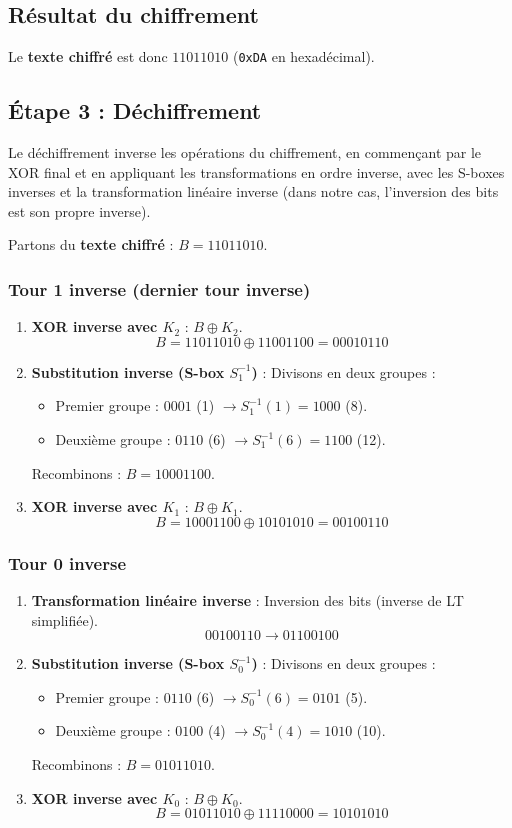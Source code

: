 \documentclass[12pt,a4paper]{report}
\begin{document}
\subsection{Résultat du chiffrement}
Le \textbf{texte chiffré} est donc \( 11011010 \) (\texttt{0xDA} en hexadécimal).

\subsection{Étape 3 : Déchiffrement}
Le déchiffrement inverse les opérations du chiffrement, en commençant par le XOR final et en appliquant les transformations en ordre inverse, avec les S-boxes inverses et la transformation linéaire inverse (dans notre cas, l'inversion des bits est son propre inverse).

Partons du \textbf{texte chiffré} : \( B = 11011010 \).

\subsubsection{Tour 1 inverse (dernier tour inverse)}
\begin{enumerate}
    \item \textbf{XOR inverse avec \( K_2 \)} : \( B \oplus K_2 \).
    \[
    B = 11011010 \oplus 11001100 = 00010110
    \]
    \item \textbf{Substitution inverse (S-box \( S_1^{-1} \))} : Divisons en deux groupes :
    \begin{itemize}
        \item Premier groupe : \( 0001 \) (1) \( \to S_1^{-1}(1) = 1000 \) (8).
        \item Deuxième groupe : \( 0110 \) (6) \( \to S_1^{-1}(6) = 1100 \) (12).
    \end{itemize}
    Recombinons : \( B = 10001100 \).
    \item \textbf{XOR inverse avec \( K_1 \)} : \( B \oplus K_1 \).
    \[
    B = 10001100 \oplus 10101010 = 00100110
    \]
\end{enumerate}

\subsubsection{Tour 0 inverse}
\begin{enumerate}
    \item \textbf{Transformation linéaire inverse} : Inversion des bits (inverse de LT simplifiée).
    \[
    00100110 \to 01100100
    \]
    \item \textbf{Substitution inverse (S-box \( S_0^{-1} \))} : Divisons en deux groupes :
    \begin{itemize}
        \item Premier groupe : \( 0110 \) (6) \( \to S_0^{-1}(6) = 0101 \) (5).
        \item Deuxième groupe : \( 0100 \) (4) \( \to S_0^{-1}(4) = 1010 \) (10).
    \end{itemize}
    Recombinons : \( B = 01011010 \).
    \item \textbf{XOR inverse avec \( K_0 \)} : \( B \oplus K_0 \).
    \[
    B = 01011010 \oplus 11110000 = 10101010
    \]
\end{enumerate}
\end{document}
